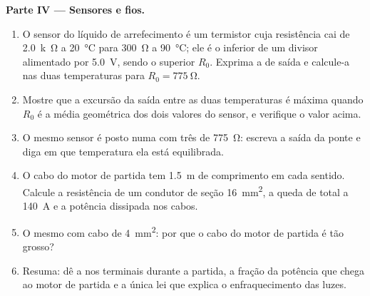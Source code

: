 \begin{problem}
\medskip
\noindent\textbf{Parte IV --- Sensores e fios.}
\begin{enumerate}[resume]
  \item O sensor do líquido de arrefecimento é um termistor cuja resistência cai de
        \qty{2.0}{k\ohm} a \qty{20}{\degreeCelsius} para \qty{300}{\ohm} a
        \qty{90}{\degreeCelsius}; ele é o  inferior de um divisor
        alimentado por \qty{5.0}{V}, sendo o  superior $R_0$. Exprima a
         de saída e calcule-a nas duas temperaturas para
        $R_0 = \qty{775}{\ohm}$.
  \item Mostre que a excursão da saída entre as duas temperaturas é
        máxima quando $R_0$ é a média geométrica dos dois valores do
        sensor, e verifique o valor acima.
  \item O mesmo sensor é posto numa  com três
         de \qty{775}{\ohm}: escreva a saída da ponte e diga em
        que temperatura ela está equilibrada.
  \item O cabo do motor de partida tem \qty{1.5}{m} de comprimento em cada sentido. Calcule a
        resistência de um condutor de seção \qty{16}{mm^2}, a
        queda de  total a \qty{140}{A} e a potência dissipada nos
        cabos.
  \item O mesmo com cabo de \qty{4}{mm^2}: por que o cabo do motor de partida é tão grosso?
  \item Resuma: dê a  nos terminais durante a partida, a
        fração da potência que chega ao motor de partida e a única lei que
        explica o enfraquecimento das luzes.
\end{enumerate}
\end{problem}
